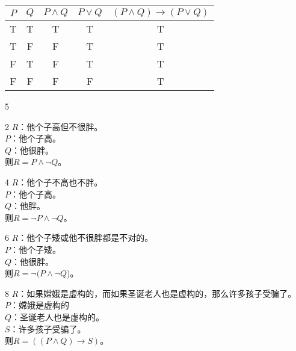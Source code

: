 \documentclass[12pt]{article}
\newenvironment{firstlayer}%
{\begin{list}{}{\renewcommand{\makelabel}[1]{\textbf{##1}.\hfil}
}}
{\end{list}}
\newenvironment{secondlayer}%
{\begin{list}{}{\renewcommand{\makelabel}[1]{(##1)\hfil}
}}
{\end{list}}
\begin{document}
\begin{CJK}{UTF8}{gbsn}
\begin{firstlayer}
\begin{secondlayer}
        \begin{longtable}[]{@{}ccccc@{}}
        \toprule
        \(P\) & \(Q\) & \(P\wedge Q\) & \(P\vee Q\) &
        \((P\wedge Q)\rightarrow (P\vee Q)\)\tabularnewline
        \midrule
        \endhead
        T & T & T & T & T\tabularnewline
        T & F & F & T& T\tabularnewline
        F & T & F & T& T\tabularnewline
        F & F & F & F& T\tabularnewline
        \bottomrule
        \end{longtable}
  \end{secondlayer}
  \item[5] 
  \begin{secondlayer}
    \item[2] \(R\)：他个子高但不很胖。\\
        \(P\)：他个子高。\\
        \(Q\)：他很胖。\\
        则\(R=P\wedge \neg Q\)。
    \item[4] \(R\)：他个子不高也不胖。\\
        \(P\)：他个子高。\\
        \(Q\)：他胖。\\
        则\(R=\neg P\wedge \neg Q\)。
    \item[6] \(R\)：他个子矮或他不很胖都是不对的。\\
        \(P\)：他个子矮。\\
        \(Q\)：他很胖。\\
        则\(R=\neg(P \wedge \neg Q\))。
    \item[8] \(R\)：如果嫦娥是虚构的，而如果圣诞老人也是虚构的，那么许多孩子受骗了。\\
        \(P\)：嫦娥是虚构的\\
        \(Q\)：圣诞老人也是虚构的。\\
        \(S\)：许多孩子受骗了。\\
        则\(R=((P\wedge Q)\rightarrow S)\)。
  \end{secondlayer}
\end{firstlayer}


\end{CJK}
\end{document}

